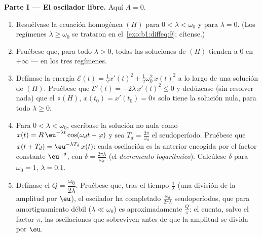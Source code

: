 \begin{problem}
\medskip
\noindent\textbf{Parte I --- El oscilador libre.} Aquí $A = 0$.
\begin{enumerate}
  \item Resuélvase la ecuación homogénea $(H)$ para
        $0 < \lambda < \omega_0$ y para $\lambda = 0$. (Los regímenes
        $\lambda \geq \omega_0$ se trataron en
        el~\cref{exo:b1:diffeq:9}; cítense.)
  \item Pruébese que, para todo $\lambda > 0$, todas las soluciones de
        $(H)$ tienden a $0$ en $+\infty$ --- en los tres regímenes.
  \item Defínase la energía $\mathcal E(t) = \frac12 x'(t)^2 +
        \frac12\omega_0^2\,x(t)^2$ a lo largo de una solución de $(H)$.
        Pruébese que $\mathcal E'(t) = -2\lambda\,x'(t)^2 \leq 0$ y
        dedúzcase (sin resolver nada) que el 
        «$(H)$, $x(t_0) = x'(t_0) = 0$» solo tiene la solución nula,
        para todo $\lambda \geq 0$.
  \item Para $0 < \lambda < \omega_0$, escríbase la solución no nula
        como $x(t) = R\,\eu^{-\lambda t}\cos(\omega_d t - \varphi)$ y
        sea $T_d = \frac{2\pi}{\omega_d}$ el seudoperíodo. Pruébese que
        $x(t + T_d) = \eu^{-\lambda T_d}\,x(t)$: cada oscilación es la
        anterior encogida por el factor constante $\eu^{-\delta}$, con
        $\delta = \frac{2\pi\lambda}{\omega_d}$ (el \emph{decremento
        logarítmico}). Calcúlese $\delta$ para $\omega_0 = 1$,
        $\lambda = 0.1$.
  \item Defínase el \emph{} $Q =
        \dfrac{\omega_0}{2\lambda}$. Pruébese
        que, tras el tiempo $\frac1\lambda$ (una división de la
        amplitud por $\eu$), el oscilador ha completado
        $\frac{\omega_d}{2\pi\lambda}$ seudoperíodos, que para
        amortiguamiento débil ($\lambda \ll \omega_0$) es
        aproximadamente $\frac Q\pi$: el  cuenta,
        salvo el factor $\pi$, las oscilaciones que sobreviven antes de
        que la amplitud se divida por $\eu$.
\end{enumerate}


\end{problem}
